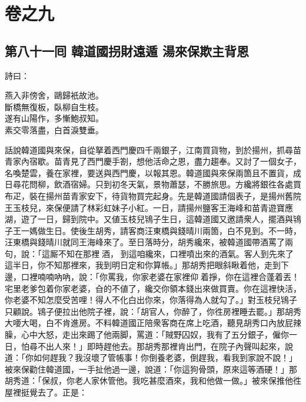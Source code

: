 \part*{{\titlename}卷之九}



\chapter*{第八十一囘 韓道國拐財遠遁 湯來保欺主背恩}


詩曰：

\begin{myquote}
燕入非傍舍，鷗歸衹故池。\\斷橋無復板，臥柳自生枝。\\遂有山陽作，多慚鮑叔知。\\素交零落盡，白首淚雙垂。
\end{myquote}

話說韓道國與來保，自從拏着西門慶四千兩銀子，江南買貨物，到於揚州，抓尋苗青家內宿歇。苗青見了西門慶手劄，想他活命之恩，盡力趨奉。又討了一個女子，名喚楚雲，養在家裡，要送與西門慶，以報其恩。韓道國與來保兩箇且不置貨，成日尋花問柳，飲酒宿婦。{}只到初冬天氣，景物蕭瑟，不勝旅思。方纔將銀徃各處買布疋，裝在揚州苗青家安下，待貨物買完起身。先是韓道國請個表子，是揚州舊院王玉枝兒，來保便請了林彩虹妹子小紅。一日，請揚州鹽客王海峰和苗青遊寶應湖，遊了一日，歸到院中。又値玉枝兒鴇子生日，{}這韓道國又邀請衆人，擺酒與鴇子王一媽做生日。使後生胡秀，請客商汪東橋與錢晴川兩箇，白不見到。不一時，汪東橋與錢晴川就同王海峰來了。至日落時分，胡秀纔來，被韓道國帶酒罵了兩句，說：「這厮不知在那裡𠳹酒，𠳹到這咱纔來，口裡噴出來的酒氣。客人到先來了這半日，你不知那裡來，我到明日定和你算帳。」那胡秀把眼斜瞅着他，走到下邊，口裡喃喃吶吶，說：「你罵我，你家老婆在家裡仰𢵞着掙，你在這裡合蓬着丟！宅里老爹包着你家老婆，㒲的不値了，纔交你領本錢出來做買賣。你在這裡快活，你老婆不知怎麼受苦哩！得人不化白出你來，你落得為人就勾了。」{}對玉枝兒鴇子只顧說。鴇子便拉出他院子裡，說：「胡官人，你醉了，你徃房裡睡去罷。」那胡秀大喓大喝，白不肯進房。不料韓道國正陪衆客商在席上吃酒，聽見胡秀口內放屁辣臊，心中大怒，走出來踢了他兩脚，罵道：「賊野囚奴，我有了五分銀子，僱你一日，怕尋不出人來！」{}即時趕他去。那胡秀那裡肯出門，在院子內聲叫起來，說道：「你如何趕我？我沒壞了管帳事！你倒養老婆，倒趕我，看我到家說不說！」{}被來保勸住韓道國，一手扯他過一邊，說道：「你這狗骨頭，原來這等酒硬！」那胡秀道：「保叔，你老人家休管他。我吃甚麼酒來，我和他做一做。」被來保推他徃屋裡挺覺去了。正是：

